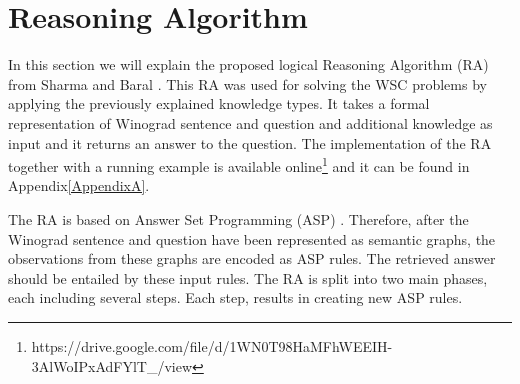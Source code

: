 \section{Reasoning Algorithm}
In this section we will explain the proposed logical Reasoning Algorithm (RA) from Sharma and Baral \cite{2018CommonsenseKT}. This RA was used for solving the WSC problems by applying the previously explained knowledge types. It takes a formal representation of Winograd sentence and question and additional knowledge as input and it returns an answer to the question. The implementation of the RA together with a running example is available online\footnote{https://drive.google.com/file/d/1WN0T98HaMFhWEEIH-3AlWoIPxAdFYlT\_/view} and it can be found in Appendix\ref{AppendixA}. 

The RA is based on Answer Set Programming (ASP) \cite{DBLP:conf/aaai/Lifschitz08}. Therefore, after the Winograd sentence and question have been represented as semantic graphs, the observations from these graphs are encoded as ASP rules. The retrieved answer should be entailed by these input rules.
The RA is split into two main phases, each including several steps. Each step, results in creating new ASP rules.
